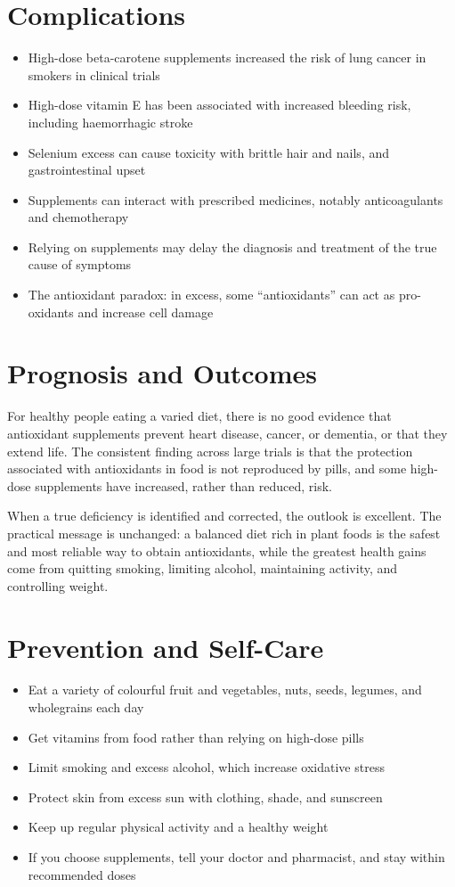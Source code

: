 \section*{Complications}
\begin{itemize}
    \item High-dose beta-carotene supplements increased the risk of lung cancer in smokers in clinical trials
    \item High-dose vitamin E has been associated with increased bleeding risk, including haemorrhagic stroke
    \item Selenium excess can cause toxicity with brittle hair and nails, and gastrointestinal upset
    \item Supplements can interact with prescribed medicines, notably anticoagulants and chemotherapy
    \item Relying on supplements may delay the diagnosis and treatment of the true cause of symptoms
    \item The antioxidant paradox: in excess, some ``antioxidants'' can act as pro-oxidants and increase cell damage
\end{itemize}

\section*{Prognosis and Outcomes}
For healthy people eating a varied diet, there is no good evidence that antioxidant supplements prevent heart disease, cancer, or dementia, or that they extend life. The consistent finding across large trials is that the protection associated with antioxidants in food is not reproduced by pills, and some high-dose supplements have increased, rather than reduced, risk.

When a true deficiency is identified and corrected, the outlook is excellent. The practical message is unchanged: a balanced diet rich in plant foods is the safest and most reliable way to obtain antioxidants, while the greatest health gains come from quitting smoking, limiting alcohol, maintaining activity, and controlling weight.

\section*{Prevention and Self-Care}
\begin{itemize}
    \item Eat a variety of colourful fruit and vegetables, nuts, seeds, legumes, and wholegrains each day
    \item Get vitamins from food rather than relying on high-dose pills
    \item Limit smoking and excess alcohol, which increase oxidative stress
    \item Protect skin from excess sun with clothing, shade, and sunscreen
    \item Keep up regular physical activity and a healthy weight
    \item If you choose supplements, tell your doctor and pharmacist, and stay within recommended doses
\end{itemize}

